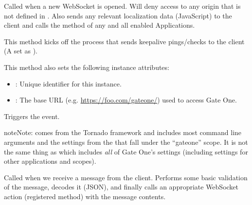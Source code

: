 \documentclass[letterpaper,10pt,openany]{sphinxmanual}
\begin{document}
\begin{fulllineitems}
\begin{fulllineitems}
\end{fulllineitems}


\begin{fulllineitems}
\label{Developer/server:gateone.core.server.ApplicationWebSocket.open}
Called when a new WebSocket is opened.  Will deny access to any
origin that is not defined in .  Also sends
any relevant localization data (JavaScript) to the client and calls the
{\hyperref[Developer/server:gateone.core.server.ApplicationWebSocket.open]{}} method of any and all enabled Applications.

This method kicks off the process that sends keepalive pings/checks to
the client (A  set as ).

This method also sets the following instance attributes:
\begin{itemize}
\item {} 
: Unique identifier for this instance.

\item {} 
: The base URL (e.g. \href{https://foo.com/gateone/}{https://foo.com/gateone/}) used to access Gate One.

\end{itemize}

Triggers the  event.

\begin{notice}{note}{Note:}
 comes from the Tornado framework and includes most
command line arguments and the settings from the  that
fall under the ``gateone'' scope.  It is not the same thing as
 which includes \emph{all} of Gate One's settings (including
settings for other applications and scopes).
\end{notice}

\end{fulllineitems}


\begin{fulllineitems}
\label{Developer/server:gateone.core.server.ApplicationWebSocket.on_message}
Called when we receive a message from the client.  Performs some basic
validation of the message, decodes it (JSON), and finally calls an
appropriate WebSocket action (registered method) with the message
contents.


\end{fulllineitems}
\end{fulllineitems}
\end{document}
